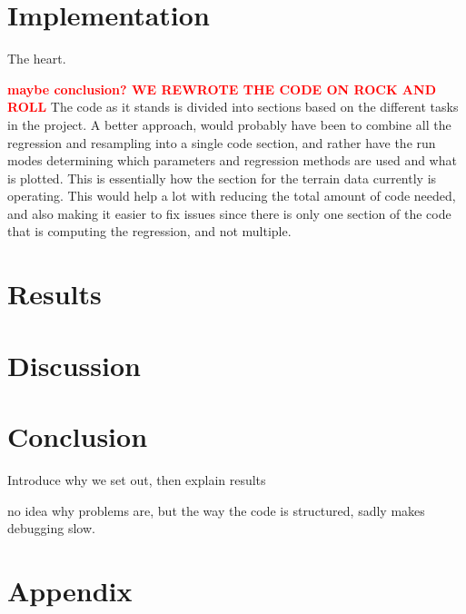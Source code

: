 \documentclass{article}
\newcommand\red[1]{\textcolor{red}{\textbf{#1}}}
\begin{document}
\section{Implementation} \label{chap:implement}
The heart. \cite{Github1}

\red{maybe conclusion? WE REWROTE THE CODE ON ROCK AND ROLL}
The code as it stands is divided into sections based on the different tasks in the project. A better approach, would probably have been to combine all the regression and resampling into a single code section, and rather have the run modes determining which parameters and regression methods are used and what is plotted. This is essentially how the section for the terrain data currently is operating. This would help a lot with reducing the total amount of code needed, and also making it easier to fix issues since there is only one section of the code that is computing the regression, and not multiple.
\section{Results} \label{chap:results}

\section{Discussion} \label{chap:discussion}

\section{Conclusion} \label{chap:conclusion}
Introduce why we set out, then explain results

no idea why problems are, but the way the code is structured, sadly makes debugging slow.


\appendix
\section{Appendix} \label{chap:appendix}
\end{document}
